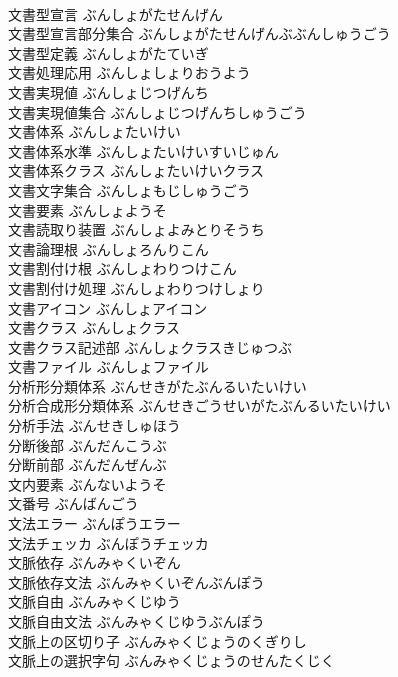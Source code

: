 \documentclass[8pt]{extreport}
\begin{document}
\begin{CJK}{UTF8}{min}
\\	文書型宣言	ぶんしょがたせんげん	
\\	文書型宣言部分集合	ぶんしょがたせんげんぶぶんしゅうごう	
\\	文書型定義	ぶんしょがたていぎ	
\\	文書処理応用	ぶんしょしょりおうよう	
\\	文書実現値	ぶんしょじつげんち	
\\	文書実現値集合	ぶんしょじつげんちしゅうごう	
\\	文書体系	ぶんしょたいけい	
\\	文書体系水準	ぶんしょたいけいすいじゅん	
\\	文書体系クラス	ぶんしょたいけいクラス	
\\	文書文字集合	ぶんしょもじしゅうごう	
\\	文書要素	ぶんしょようそ	
\\	文書読取り装置	ぶんしょよみとりそうち	
\\	文書論理根	ぶんしょろんりこん	
\\	文書割付け根	ぶんしょわりつけこん	
\\	文書割付け処理	ぶんしょわりつけしょり	
\\	文書アイコン	ぶんしょアイコン	
\\	文書クラス	ぶんしょクラス	
\\	文書クラス記述部	ぶんしょクラスきじゅつぶ	
\\	文書ファイル	ぶんしょファイル	
\\	分析形分類体系	ぶんせきがたぶんるいたいけい	
\\	分析合成形分類体系	ぶんせきごうせいがたぶんるいたいけい	
\\	分析手法	ぶんせきしゅほう	
\\	分断後部	ぶんだんこうぶ	
\\	分断前部	ぶんだんぜんぶ	
\\	文内要素	ぶんないようそ	
\\	文番号	ぶんばんごう	
\\	文法エラー	ぶんぽうエラー	
\\	文法チェッカ	ぶんぽうチェッカ	
\\	文脈依存	ぶんみゃくいぞん	
\\	文脈依存文法	ぶんみゃくいぞんぶんぽう	
\\	文脈自由	ぶんみゃくじゆう	
\\	文脈自由文法	ぶんみゃくじゆうぶんぽう	
\\	文脈上の区切り子	ぶんみゃくじょうのくぎりし	
\\	文脈上の選択字句	ぶんみゃくじょうのせんたくじく	

\end{CJK}
\end{document}
